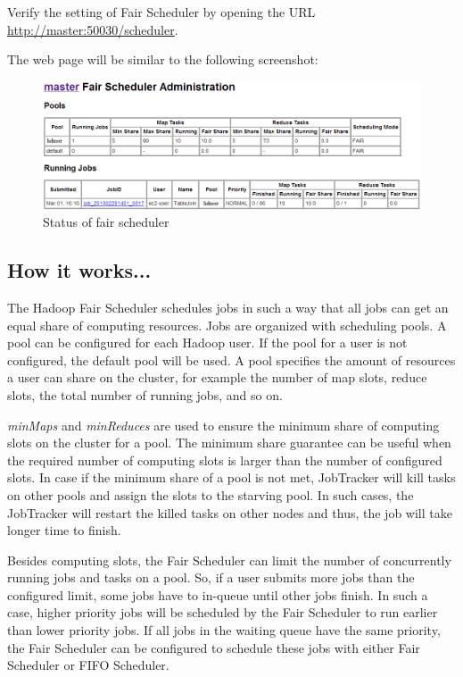 Verify the setting of Fair Scheduler by opening the URL \url{http://master:50030/scheduler}.

The web page will be similar to the following screenshot:
\begin{figure}[h]
  \centering
  \includegraphics[width=\textwidth]{figs/5163os_04_16.png}
  \caption{Status of fair scheduler}\label{fig:fairscheduler}
\end{figure} 

\subsection*{How it works...}
The Hadoop Fair Scheduler schedules jobs in such a way that all jobs can get an equal share of computing resources. Jobs are organized with scheduling pools. A pool can be configured for each Hadoop user. If the pool for a user is not configured, the default pool will be used. A pool specifies the amount of resources a user can share on the cluster, for example the number of map slots, reduce slots, the total number of running jobs, and so on.

\emph{minMaps} and \emph{minReduces} are used to ensure the minimum share of computing slots on the cluster for a pool. The minimum share guarantee can be useful when the required number of computing slots is larger than the number of configured slots. In case if the minimum share of a pool is not met, JobTracker will kill tasks on other pools and assign the slots to the starving pool. In such cases, the JobTracker will restart the killed tasks on other nodes and thus, the job will take longer time to finish.

Besides computing slots, the Fair Scheduler can limit the number of concurrently running jobs and tasks on a pool. So, if a user submits more jobs than the configured limit, some jobs have to in-queue until other jobs finish. In such a case, higher priority jobs will be scheduled by the Fair Scheduler to run earlier than lower priority jobs. If all jobs in the waiting queue have the same priority, the Fair Scheduler can be configured to schedule these jobs with either Fair Scheduler or FIFO Scheduler.

